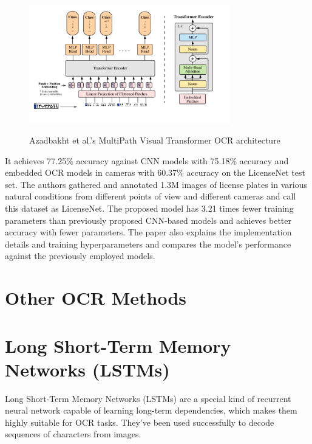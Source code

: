 \begin{figure}[ht]
    \centering
    \includegraphics[width=0.78\textwidth]{Figures/CRNN_Papers/Azadbakht_2022.jpg}
    \caption[Azadbakht et al.'s MultiPath Visual Transformer OCR architecture]{Azadbakht et al.'s MultiPath Visual Transformer OCR architecture}\cite{azadbakhtMultiPathViTOCR2022}
    \label{fig:Azadbakht et al.'s MultiPath Visual Transformer OCR architecture}
\end{figure}

It achieves 77.25\% accuracy against CNN models with 75.18\% accuracy and embedded OCR models in cameras with 60.37\% accuracy on the LicenseNet test set. The authors gathered and annotated 1.3M images of license plates in various natural conditions from different points of view and different cameras and call this dataset as LicenseNet. The proposed model has 3.21 times fewer training parameters than previously proposed CNN-based models and achieves better accuracy with fewer parameters. The paper also explains the implementation details and training hyperparameters and compares the model's performance against the previously employed models.\cite{azadbakhtMultiPathViTOCR2022}

\newpage

\section*{Other OCR Methods}

\section{Long Short-Term Memory Networks (LSTMs)}

Long Short-Term Memory Networks (LSTMs) are a special kind of recurrent neural network capable of learning long-term dependencies, which makes them highly suitable for OCR tasks. They've been used successfully to decode sequences of characters from images.\cite{breuelHighPerformanceOCRPrinted2013}

